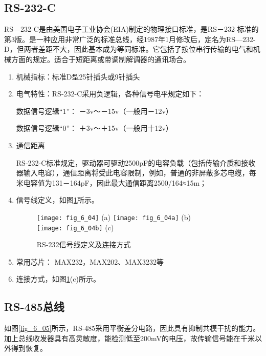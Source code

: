 \subsection{RS-232-C}

RS—232-C是由美国电子工业协会(EIA)制定的物理接口标准，是RS－232 标准的第3版。是一种应用非常广泛的标准总线，经1987年1月修改后，定名为RS—232-D，但两者差距不大，因此基本成为等同标准。它包括了按位串行传输的电气和机械方面的规定。适合于短距离或带调制解调器的通讯场合。

\begin{enumerate}
  \item 机械指标：标准D型25针插头或9针插头


  \item 电气特性：RS-232-C采用负逻辑，各种信号电平规定如下：

数据信号逻辑“1”：  －3v～－15v（一般用－12v）

数据信号逻辑“0”：  ＋3v～＋15v（一般用十12v）

  \item 通信距离

  RS-232-C标准规定，驱动器可驱动2500pF的电容负载（包括传输介质和接收器输入电容），通信距离将受此电容限制，例如，普通的非屏蔽多芯电缆，每米电容值为131－164pF，因此最大通信距离2500/164≈15m；

\item 信号线定义，如图\ref{fig_6_04}所示。
\begin{figure}
  \centering
  \texttt{[image: fig\_6\_04]} (a)
  \texttt{[image: fig\_6\_04a]} (b)\\
  \texttt{[image: fig\_6\_04b]} (c)
  \caption{RS-232信号线定义及连接方式}\label{fig_6_04}
\end{figure}

\item 常用芯片： MAX232，MAX202、MAX3232等

\item 连接方式，如图\ref{fig_6_04}(c)所示。



\end{enumerate}




\subsection{RS-485总线}

如图\ref{fig_6_05}所示，RS-485采用平衡差分电路，因此具有抑制共模干扰的能力。加上总线收发器具有高灵敏度，能检测低至200mV的电压，故传输信号能在千米以外得到恢复。

